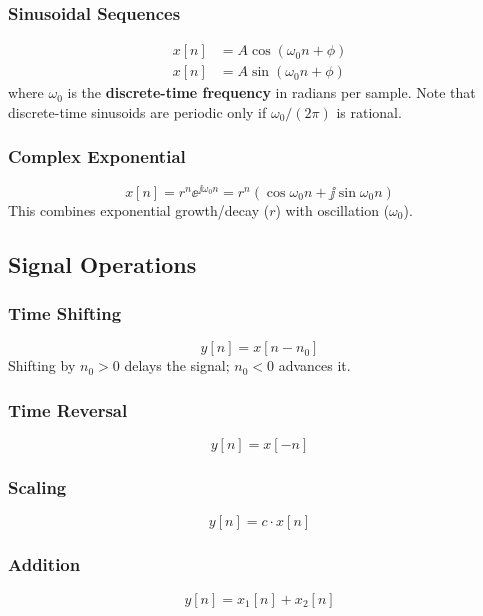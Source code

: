 \subsubsection{Sinusoidal Sequences}
\begin{align}
x[n] &= A\cos(\omega_0 n + \phi) \\
x[n] &= A\sin(\omega_0 n + \phi)
\end{align}
where $\omega_0$ is the \textbf{discrete-time frequency} in radians per sample. Note that discrete-time sinusoids are periodic only if $\omega_0/(2\pi)$ is rational.

\subsubsection{Complex Exponential}
\begin{equation}
x[n] = r^n \ee^{\jj\omega_0 n} = r^n(\cos\omega_0 n + \jj\sin\omega_0 n)
\end{equation}
This combines exponential growth/decay ($r$) with oscillation ($\omega_0$).

\subsection{Signal Operations}

\subsubsection{Time Shifting}
\begin{equation}
y[n] = x[n - n_0]
\end{equation}
Shifting by $n_0 > 0$ delays the signal; $n_0 < 0$ advances it.

\subsubsection{Time Reversal}
\begin{equation}
y[n] = x[-n]
\end{equation}

\subsubsection{Scaling}
\begin{equation}
y[n] = c \cdot x[n]
\end{equation}

\subsubsection{Addition}
\begin{equation}
y[n] = x_1[n] + x_2[n]
\end{equation}

